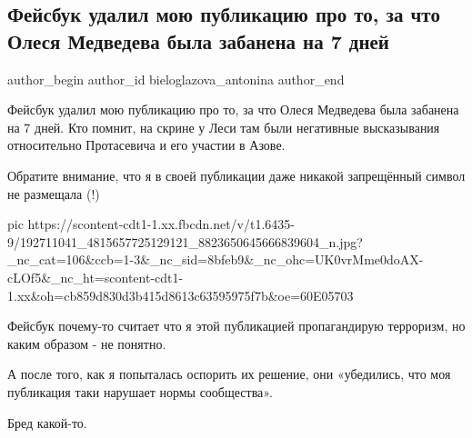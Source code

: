  
 
 
 
 
 
\subsection{Фейсбук удалил мою публикацию про то, за что Олеся Медведева была забанена на 7 дней}
\label{sec:28_05_2021.fb.bieloglazova_antonina.1.olesja_medvedeva_facebook_ban}
\ifcmt
 author_begin
   author_id bieloglazova_antonina
 author_end
\fi

Фейсбук удалил мою публикацию про то, за что Олеся Медведева была забанена на 7
дней. Кто помнит, на скрине у Леси там были негативные высказывания
относительно Протасевича и его участии в Азове. 

Обратите внимание, что я в своей публикации даже никакой запрещённый символ не размещала (!)

\ifcmt
  pic https://scontent-cdt1-1.xx.fbcdn.net/v/t1.6435-9/192711041_4815657725129121_8823650645666839604_n.jpg?_nc_cat=106&ccb=1-3&_nc_sid=8bfeb9&_nc_ohc=UK0vrMme0doAX-cLOf5&_nc_ht=scontent-cdt1-1.xx&oh=cb859d830d3b415d8613c63595975f7b&oe=60E05703
\fi

Фейсбук почему-то считает что я этой публикацией пропагандирую терроризм, но
каким образом - не понятно. 

А после того, как я попыталась оспорить их решение, они «убедились, что моя
публикация таки нарушает нормы сообщества». 

Бред какой-то.

